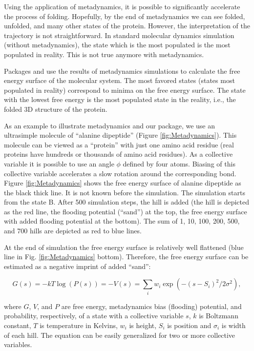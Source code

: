 Using the application of metadynamics, it is possible to significantly
accelerate the process of folding. Hopefully, by the end of metadynamics
we can see folded, unfolded, and many other states of the protein.
However, the interpretation of the trajectory is not straightforward. In
standard molecular dynamics simulation (without metadynamics), the state
which is the most populated is the most populated in reality. This is
not true anymore with metadynamics.

Packages  and  use the
results of metadynamics simulations to calculate the free energy surface
of the molecular system. The most favored states (states most populated
in reality) correspond to minima on the free energy surface. The state
with the lowest free energy is the most populated state in the reality,
i.e., the folded 3D structure of the protein.

As an example to illustrate metadynamics and our package, we use an
ultrasimple molecule of ``alanine dipeptide'' (Figure
\ref{fig:Metadynamics}). This molecule can be viewed as a ``protein''
with just one amino acid residue (real proteins have hundreds or
thousands of amino acid residues). As a collective variable it is
possible to use an angle \(\phi\) defined by four atoms. Biasing of this
collective variable accelerates a slow rotation around the corresponding
bond. Figure \ref{fig:Metadynamics} shows the free energy surface of
alanine dipeptide as the black thick line. It is not known before the
simulation. The simulation starts from the state B. After 500 simulation
steps, the hill is added (the hill is depicted as the red line, the
flooding potential (``sand'') at the top, the free energy surface with
added flooding potential at the bottom). The sum of 1, 10, 100, 200,
500, and 700 hills are depicted as red to blue lines.

At the end of simulation the free energy surface is relatively well
flattened (blue line in Fig. \ref{fig:Metadynamics} bottom). Therefore,
the free energy surface can be estimated as a negative imprint of added
``sand'':

\begin{equation}
G(s) = -kT \log(P(s)) = -V(s) = \sum_i w_i \exp(-(s-S_i)^2/{2 \sigma^2}),
\label{eq:mtd}
\end{equation}

where \(G\), \(V\), and \(P\) are free energy, metadynamics bias
(flooding) potential, and probability, respectively, of a state with a
collective variable \(s\), \(k\) is Boltzmann constant, \(T\) is
temperature in Kelvins, \(w_i\) is height, \(S_i\) is position and
\(\sigma_i\) is width of each hill. The equation can be easily
generalized for two or more collective variables.

